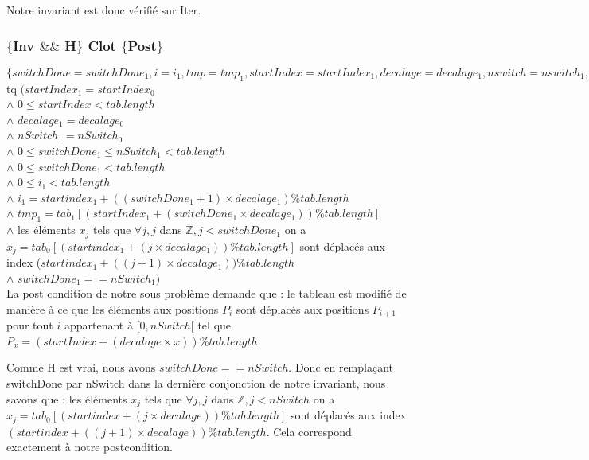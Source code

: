 Notre invariant est donc vérifié sur Iter. \\

\subsubsection*{$\{$Inv $\&\&$ H$\}$ Clot $\{$Post$\}$}

$\{switchDone = switchDone_{1}, i = i_{1}, tmp = tmp_{1}, startIndex = startIndex_{1}, decalage = decalage_{1}, nswitch = nswitch_{1}, tab = tab_{1}\}$\\ 
tq $(startIndex_{1} = startIndex_{0}$\\
$\wedge$ $0 \leq startIndex < tab.length$\\
$\wedge$ $decalage_{1} = decalage_{0}$\\
$\wedge$ $nSwitch_{1} = nSwitch_{0}$\\
$\wedge$ $0 \leq switchDone_{1} \leq nSwitch_{1} < tab.length$\\
$\wedge$ $0\leq switchDone_{1} < tab.length$\\
$\wedge$ $0\leq i_{1} < tab.length$\\
$\wedge$ $i_{1} = startindex_{1} + ((switchDone_{1}+1)\times decalage_{1}) \% tab.length$\\
$\wedge$ $tmp_{1} = tab_{1}[(startIndex_{1} + (switchDone_{1}\times decalage_{1}))  \% tab.length]$\\
$\wedge$ les éléments $x_{j}$ tels que $\forall j, j$ dans $\mathbb{Z}, j<switchDone_{1}$ on a $x_{j}=tab_{0}[(startindex_{1} + (j\times decalage_{1})) \% tab.length]$ sont déplacés aux index ($startindex_{1} + ((j+1)\times  decalage_{1}))\% tab.length$\\
$\wedge$ $switchDone_{1} == nSwitch_{1})$ \\

La post condition de notre sous problème demande que : le tableau est modifié de manière à ce que les éléments aux positions $P_{i}$ sont déplacés aux positions $P_{i+1}$ pour tout $i$ appartenant à $[0,nSwitch[$ tel que $P_{x} = (startIndex + (decalage\times x)) \% tab.length$.

Comme H est vrai, nous avons $switchDone == nSwitch$. Donc en remplaçant switchDone par nSwitch dans la dernière conjonction de notre invariant, nous savons que : les éléments $x_{j}$ tels que $\forall j, j$ dans $\mathbb{Z}, j<nSwitch$ on a $x_{j}=tab_{0}[(startindex + (j\times decalage)) \% tab.length]$ sont déplacés aux index $(startindex + ((j+1)\times decalage)) \% tab.length.$ 
Cela correspond exactement à notre postcondition.\\

